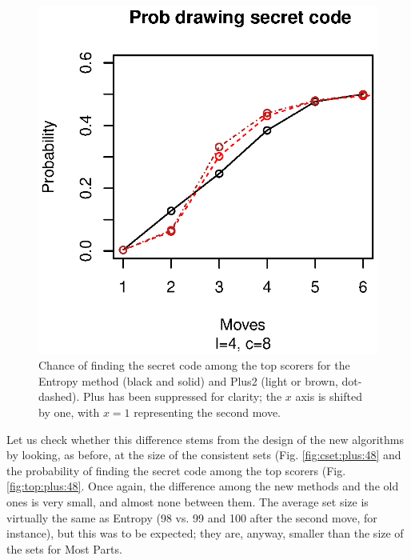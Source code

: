 \documentclass[preprint,12pt]{elsarticle}
\begin{document}
%
\begin{figure}[!htb]
\centering
\includegraphics{prob-plus-48.eps}
\caption{Chance of finding the secret code among the top scorers for the
  Entropy method (black and solid) and Plus2 (light or
  brown, dot-dashed). Plus has been suppressed for clarity; the $x$
  axis is shifted by one, with $x=1$ representing the second
  move.\label{fig:prob:plus:48}} 
\end{figure} 

Let us check whether this difference stems from the design of the new
algorithms by looking, as before, at the size of the consistent sets
(Fig. \ref{fig:cset:plus:48} 
and the probability of finding the secret code among the top scorers
(Fig. \ref{fig:top:plus:48}. Once again, the difference among the new
methods and the old ones is very small, and almost none between
them. The average set size is virtually the same as Entropy (98 vs. 99
and 100 after the second move, for instance), but this was to be
expected; they are, anyway, smaller than the size of the sets for Most
Parts. 
\end{document}
